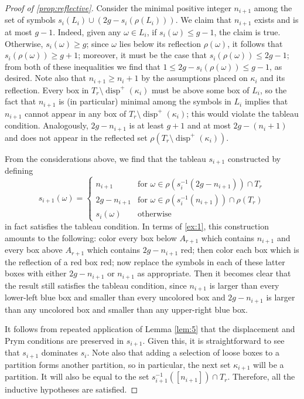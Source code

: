 \documentclass[11pt,reqno]{amsart}
\newcommand*{\inv}[1]{#1^{-1}}
\newcommand*{\disp}{\operatorname{disp}^{+}}
\theoremstyle{definition}
\theoremstyle{problem}
\theoremstyle{plain}
\theoremstyle{remark}
\theoremstyle{theorem}
\numberwithin{equation}{section}
\numberwithin{figure}{section}
\begin{document}
\begin{proof}[Proof of \cref{prop:reflective}]
  Consider the minimal positive integer $n_{i+1}$ among the set of
  symbols $s_i(L_i) \cup (2g - s_i(\rho(L_i)))$.  We claim that
  $n_{i+1}$ exists and is at most $g-1$.  Indeed, given any
  $\omega \in L_i$, if $s_i(\omega) \leq g-1$, the claim is true.
  Otherwise, $s_i(\omega) \geq g$; since $\omega$ lies below its
  reflection $\rho(\omega)$, it follows that
  $s_i(\rho(\omega)) \geq g+1$; moreover, it must be the case that
  $s_i(\rho(\omega)) \leq 2g-1$; from both of these inequalities we
  find that $1 \leq 2g-s_i(\rho(\omega)) \leq g-1$, as desired.  Note
  also that $n_{i+1} \geq n_i+1$ by the assumptions placed on
  $\kappa_i$ and its reflection.  Every box in
  $T_r \setminus \disp(\kappa_i)$ must be above some box of $L_i$, so
  the fact that $n_{i+1}$ is (in particular) minimal among the symbols
  in $L_i$ implies that $n_{i+1}$ cannot appear in any box of
  $T_r \setminus \disp(\kappa_i)$; this would violate the tableau
  condition.  Analogously, $2g-n_{i+1}$ is at least $g+1$ and at most
  $2g-(n_i+1)$ and does not appear in the reflected set
  $\rho(T_r \setminus \disp(\kappa_i))$.

  From the considerations above, we find that the tableau $s_{i+1}$
  constructed by defining
  \begin{equation*}
    \label{eq:10}
    s_{i+1}(\omega) = 
    \begin{cases}
      n_{i+1} &
      \text{for } \omega \in \rho(\inv s_i(2g-n_{i+1})) \cap T_r \\
      2g - n_{i+1} &
      \text{for } \omega \in \rho(\inv s_i(n_{i+1})) \cap \rho(T_r) \\
      s_i(\omega) & \text{otherwise }
    \end{cases}
  \end{equation*}
  in fact satisfies the tableau condition.  In terms of \cref{ex:1},
  this construction amounts to the following: color every box below
  $A_{r+1}$ which contains $n_{i+1}$ and every box above $A_{r+1}$
  which contains $2g - n_{i+1}$ red; then color each box which is the
  reflection of a red box red; now replace the symbols in each of
  these latter boxes with either $2g-n_{i+1}$ or $n_{i+1}$ as
  appropriate.  Then it becomes clear that the result still satisfies
  the tableau condition, since $n_{i+1}$ is larger than every
  lower-left blue box and smaller than every uncolored box and
  $2g-n_{i+1}$ is larger than any uncolored box and smaller than any
  upper-right blue box.

  It follows from repeated application of Lemma \ref{lem:5} that the
  displacement and Prym conditions are preserved in $s_{i+1}$.  Given
  this, it is straightforward to see that $s_{i+1}$ dominates $s_i$.
  Note also that adding a selection of loose boxes to a partition
  forms another partition, so in particular, the next set
  $\kappa_{i+1}$ will be a partition.  It will also be equal to the
  set $\inv s_{i+1} ([n_{i+1}]) \cap T_r$.  Therefore, all the
  inductive hypotheses are satisfied.


\end{proof}
\end{document}
